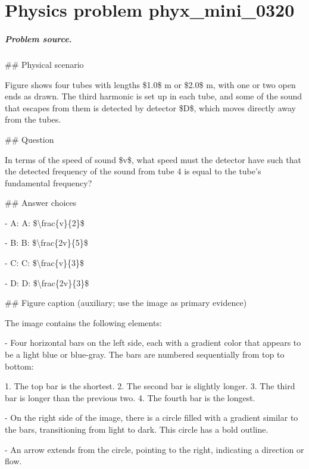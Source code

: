 
\chapter{Physics problem phyx\_mini\_0320}
\label{ch:PhyXMiniProblems_problem_phyx_mini_0320}

\paragraph{Problem source.}
\#\# Physical scenario

Figure shows four tubes with lengths \$1.0\$ m or \$2.0\$ m, with one or two open ends as drawn. The third harmonic is set up in each tube, and some of the sound that escapes from them is detected by detector \$D\$, which moves directly away from the tubes.

\#\# Question

In terms of the speed of sound \$v\$, what speed must the detector have such that the detected frequency of the sound from tube 4 is equal to the tube's fundamental frequency?

\#\# Answer choices

- A: A: \$\textbackslash{}frac\{v\}\{2\}\$

- B: B: \$\textbackslash{}frac\{2v\}\{5\}\$

- C: C: \$\textbackslash{}frac\{v\}\{3\}\$

- D: D: \$\textbackslash{}frac\{2v\}\{3\}\$

\#\# Figure caption (auxiliary; use the image as primary evidence)

The image contains the following elements:

- Four horizontal bars on the left side, each with a gradient color that appears to be a light blue or blue-gray. The bars are numbered sequentially from top to bottom:

  1. The top bar is the shortest.
  2. The second bar is slightly longer.
  3. The third bar is longer than the previous two.
  4. The fourth bar is the longest.

- On the right side of the image, there is a circle filled with a gradient similar to the bars, transitioning from light to dark. This circle has a bold outline.

- An arrow extends from the circle, pointing to the right, indicating a direction or flow.

